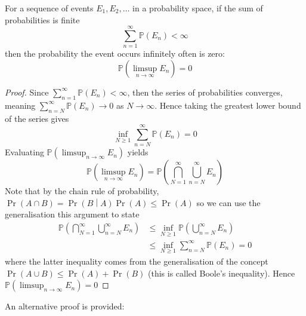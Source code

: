 \documentclass[11pt]{report} %
\begin{document}
For a sequence of events $E_{1}, E_{2}, \dots$ in a probability space, if the sum of probabilities is finite
\begin{equation}
\sum_{n = 1}^{\infty}\mathbb{P}\left(E_{n}\right) < \infty
\end{equation}
then the probability the event occurs infinitely often is zero:
\begin{equation}
\mathbb{P}\left(\limsup_{n\to\infty}E_{n}\right) = 0
\end{equation}
\begin{proof}
Since $\sum_{n = 1}^{\infty}\mathbb{P}\left(E_{n}\right) < \infty$, then the series of probabilities converges, meaning $\sum_{n = N}^{\infty}\mathbb{P}\left(E_{n}\right) \to 0$ as $N \to \infty$. Hence taking the greatest lower bound of the series gives
\begin{equation}
\inf_{N \geq 1}\sum_{n = N}^{\infty}\mathbb{P}\left(E_{n}\right) = 0
\end{equation}
Evaluating $\mathbb{P}\left(\limsup_{n\to\infty}E_{n}\right)$ yields
\begin{equation}
\mathbb{P}\left(\limsup_{n\to\infty}E_{n}\right) = \mathbb{P}\left(\bigcap_{N = 1}^{\infty}\bigcup_{n = N}^{\infty}E_{n}\right)
\end{equation}
Note that by the chain rule of probability, $\operatorname{Pr}\left(A \cap B\right) = \operatorname{Pr}\left(B \middle| A\right)\operatorname{Pr}\left(A\right) \leq \operatorname{Pr}\left(A\right)$ so we can use the generalisation this argument to state
\begin{align}
\mathbb{P}\left(\bigcap_{N = 1}^{\infty}\bigcup_{n = N}^{\infty}E_{n}\right) &\leq \inf_{N \geq 1}\mathbb{P}\left(\bigcup_{n = N}^{\infty}E_{n}\right) \\
&\leq \inf_{N \geq 1}\sum_{n = N}^{\infty}\mathbb{P}\left(E_{n}\right) = 0
\end{align}
where the latter inequality comes from the generalisation of the concept $\operatorname{Pr}\left(A \cup B\right) \leq \operatorname{Pr}\left(A\right) + \operatorname{Pr}\left(B\right)$ (this is called Boole's inequality). Hence $\mathbb{P}\left(\limsup_{n\to\infty}E_{n}\right) = 0$
\end{proof}
An alternative proof is provided:
\end{document}
